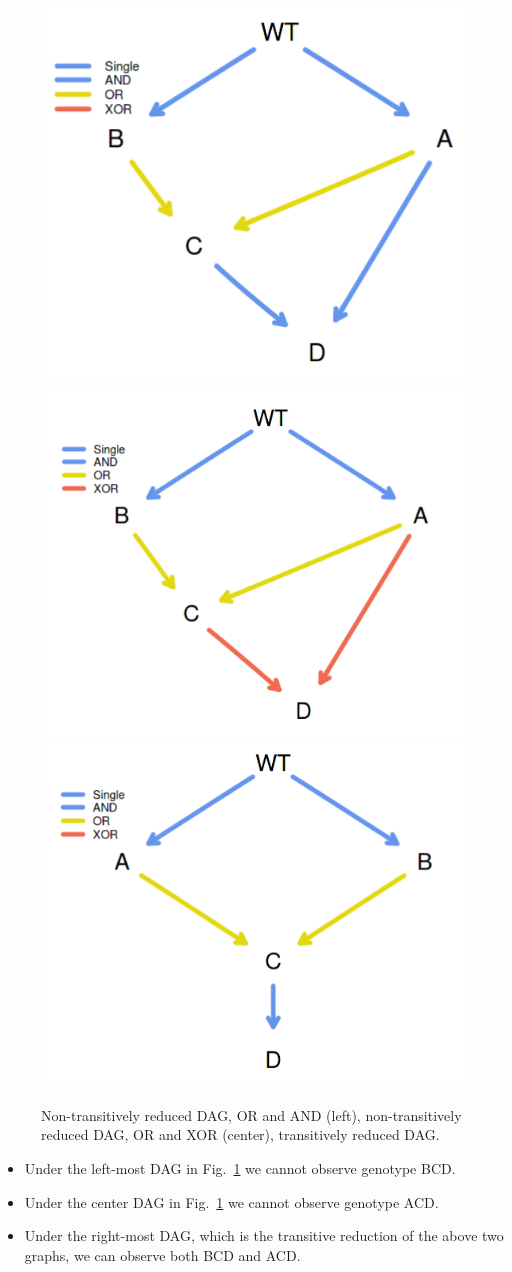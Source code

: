 \documentclass[a4paper,11pt]{article}
\begin{document}
\begin{figure}[h!]
  \hspace*{-1.8cm}
  \includegraphics[width=.35\linewidth]{./dag2.png}
\includegraphics[width=.35\linewidth]{./dag3.png}
\includegraphics[width=.35\linewidth]{./dag1.png}
\caption{Non-transitively reduced DAG, OR and AND (left),
  non-transitively reduced DAG, OR and XOR (center),
  transitively reduced DAG.}\label{dag2}
\end{figure}

\begin{itemize}
\item Under the left-most DAG in Fig.~\ref{dag2} we cannot observe genotype BCD.
\item Under the center DAG in Fig.~\ref{dag2} we cannot observe genotype ACD.
\item Under the right-most DAG, which is the transitive reduction of the above two graphs, we can observe both BCD and ACD.
\end{itemize}


\end{document}
